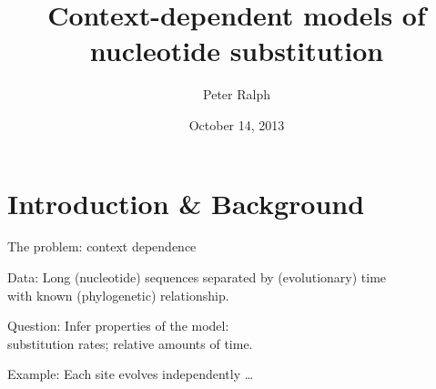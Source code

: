 \documentclass[smaller]{beamer}
\title[Context-dependent models] %
{Context-dependent models of nucleotide substitution}
\author %
{Peter Ralph}
\institute[USC]
{
  USC -- Computational Biology and Bioinformatics
  }
\date %
{October 14, 2013}
\begin{document}

%
%
%


\section{Introduction \& Background}

\begin{frame}{The problem: context dependence}

  {\struct Data:} Long (nucleotide) sequences separated by (evolutionary) time \\
    with known (phylogenetic) relationship.

  {\struct Question:} Infer properties of the model:\\
    substitution rates; relative amounts of time.

  {\struct Example:} Each site evolves independently \ldots

\end{frame}
\end{document}
